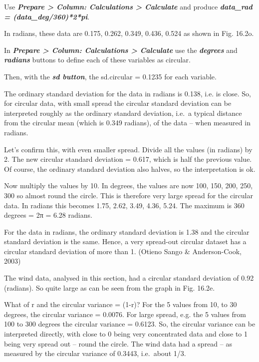 \documentclass[
  letterpaper,
  DIV=11,
  numbers=noendperiod]{scrreprt}
\begin{document}
Use \textbf{\emph{Prepare \textgreater{} Column: Calculations
\textgreater{} Calculate}} and produce \textbf{\emph{data\_rad =
(data\_deg/360)*2*pi}}.

In radians, these data are 0.175, 0.262, 0.349, 0.436, 0.524 as shown in
Fig. 16.2o.

In \textbf{\emph{Prepare \textgreater{} Column: Calculations
\textgreater{} Calculate}} use the \textbf{\emph{degrees}} and
\textbf{\emph{radians}} buttons to define each of these variables as
circular.

Then, with the \textbf{\emph{sd button}}, the sd.circular = 0.1235 for
each variable.

The ordinary standard deviation for the data in radians is 0.138, i.e.
is close. So, for circular data, with small spread the circular standard
deviation can be interpreted roughly as the ordinary standard deviation,
i.e.~a typical distance from the circular mean (which is 0.349 radians),
of the data -- when measured in radians.

Let's confirm this, with even smaller spread. Divide all the values (in
radians) by 2. The new circular standard deviation = 0.617, which is
half the previous value. Of course, the ordinary standard deviation also
halves, so the interpretation is ok.

Now multiply the values by 10. In degrees, the values are now 100, 150,
200, 250, 300 so almost round the circle. This is therefore very large
spread for the circular data. In radians this becomes 1.75, 2.62, 3.49,
4.36, 5.24. The maximum is 360 degrees = 2π = 6.28 radians.

For the data in radians, the ordinary standard deviation is 1.38 and the
circular standard deviation is the same. Hence, a very spread-out
circular dataset has a circular standard deviation of more than 1.
(Otieno Sango \& Anderson-Cook, 2003)

The wind data, analysed in this section, had a circular standard
deviation of 0.92 (radians). So quite large as can be seen from the
graph in Fig. 16.2e.

What of r and the circular variance = (1-r)? For the 5 values from 10,
to 30 degrees, the circular variance = 0.0076. For large spread, e.g.
the 5 values from 100 to 300 degrees the circular variance = 0.6123. So,
the circular variance can be interpreted directly, with close to 0 being
very concentrated data and close to 1 being very spread out -- round the
circle. The wind data had a spread -- as measured by the circular
variance of 0.3443, i.e.~about 1/3.
\end{document}
